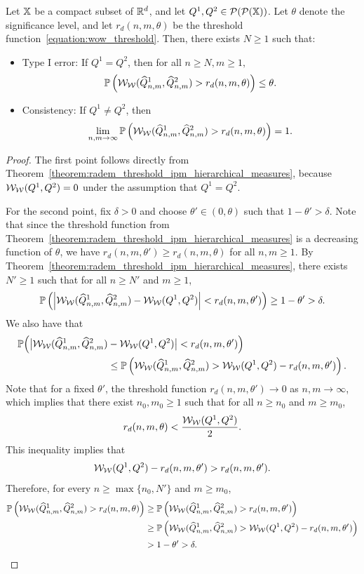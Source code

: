 \begin{theorem}
\label{theorem:radem_consistency_wow}
Let $\mathbb{X}$ be a compact subset of $\mathbb{R}^d$, and let $Q^1, Q^2 \in \mathcal{P}(\mathcal{P}(\mathbb{X}))$. Let $\theta$ denote the significance level, and let $r_d(n, m, \theta)$ be the threshold function~\eqref{equation:wow_threshold}. Then, there exists $N \geq 1$ such that:
\begin{itemize}
    \item Type I error: If $Q^1 = Q^2$, then for all $n \geq N, m \geq 1,$
    $$\mathbb{P}\left( \mathcal{W}_{\mathcal{W}}(\widehat{Q}_{n,m}^1, \widehat{Q}_{n,m}^2) > r_d(n,m, \theta) \right) \leq \theta.$$
    \item Consistency: If $Q^1 \neq Q^2$, then  
    $$\lim_{n,m\to \infty}\mathbb{P}\left( \mathcal{W}_{\mathcal{W}}(\widehat{Q}_{n,m}^1, \widehat{Q}_{n,m}^2) > r_d(n,m, \theta) \right) = 1.$$
\end{itemize}
\end{theorem}
\begin{proof}
The first point follows directly from Theorem~\ref{theorem:radem_threshold_ipm_hierarchical_measures}, because \(\mathcal{W}_{\mathcal{W}}(Q^1, Q^2) = 0\) under the assumption that \(Q^1 = Q^2.\)

For the second point, fix \(\delta > 0\) and choose \(\theta' \in (0, \theta)\) such that \(1 - \theta' > \delta\). Note that since the threshold function from Theorem~\ref{theorem:radem_threshold_ipm_hierarchical_measures} is a decreasing function of \(\theta\), we have \(r_d(n,m,\theta') \geq r_d(n,m,\theta)\) for all \(n, m \geq 1\). By Theorem~\ref{theorem:radem_threshold_ipm_hierarchical_measures}, there exists \(N' \geq 1\) such that for all \(n \geq N'\) and \(m \geq 1\),
\begin{align*}
\mathbb{P}\left( \left|\mathcal{W}_{\mathcal{W}}(\widehat{Q}^1_{n,m}, \widehat{Q}^2_{n,m}) - \mathcal{W}_{\mathcal{W}}(Q^1, Q^2) \right| < r_d(n, m, \theta') \right) \geq 1 - \theta' > \delta.
\end{align*}
We also have that
\begin{align*}
\mathbb{P}\Big(\big|\mathcal{W}_{\mathcal{W}}(\widehat{Q}^1_{n,m}, \widehat{Q}^2_{n,m}) &- \mathcal{W}_{\mathcal{W}}(Q^1, Q^2) \big| < r_d(n, m, \theta') \Big) \\
& \leq \mathbb{P}\left( \mathcal{W}_{\mathcal{W}}(\widehat{Q}^1_{n,m}, \widehat{Q}^2_{n,m}) > \mathcal{W}_{\mathcal{W}}(Q^1, Q^2) - r_d(n, m, \theta') \right).
\end{align*}
Note that for a fixed \(\theta'\), the threshold function \(r_d(n, m, \theta') \to 0\) as \(n, m \to \infty\), which implies that there exist \(n_0, m_0 \geq 1\) such that for all \(n \geq n_0\) and \(m \geq m_0\),
\[
r_d(n, m, \theta) < \frac{\mathcal{W}_{\mathcal{W}}(Q^1, Q^2)}{2}.
\]
This inequality implies that
\[
\mathcal{W}_{\mathcal{W}}(Q^1, Q^2) - r_d(n, m, \theta') > r_d(n, m, \theta').
\]
Therefore, for every \(n \geq \max\{n_0, N'\}\) and \(m \geq m_0\),
\begin{align*}
\mathbb{P}\left( \mathcal{W}_{\mathcal{W}}(\widehat{Q}^1_{n,m}, \widehat{Q}^2_{n,m}) > r_d(n, m, \theta) \right) &\geq \mathbb{P}\left( \mathcal{W}_{\mathcal{W}}(\widehat{Q}^1_{n,m}, \widehat{Q}^2_{n,m}) > r_d(n, m, \theta') \right)\\
&\geq \mathbb{P}\left( \mathcal{W}_{\mathcal{W}}(\widehat{Q}^1_{n,m}, \widehat{Q}^2_{n,m}) > \mathcal{W}_{\mathcal{W}}(Q^1, Q^2) - r_d(n, m, \theta') \right) \\
&> 1- \theta' > \delta.
\end{align*}
\end{proof}
